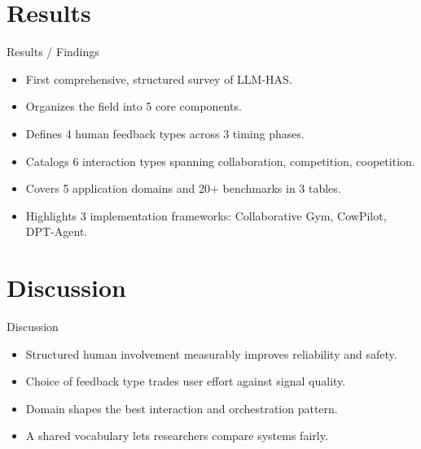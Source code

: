 \documentclass[10pt]{beamer}
\begin{document}
\section{Results}
\begin{frame}[allowframebreaks]{Results / Findings}
\begin{itemize}
  \item First comprehensive, structured survey of LLM-HAS.
  \item Organizes the field into 5 core components.
  \item Defines 4 human feedback types across 3 timing phases.
  \item Catalogs 6 interaction types spanning collaboration, competition, coopetition.
  \item Covers 5 application domains and 20+ benchmarks in 3 tables.
  \item Highlights 3 implementation frameworks: Collaborative Gym, CowPilot, DPT-Agent.
\end{itemize}
\end{frame}
\section{Discussion}
\begin{frame}{Discussion}
\begin{itemize}
  \item Structured human involvement measurably improves reliability and safety.
  \item Choice of feedback type trades user effort against signal quality.
  \item Domain shapes the best interaction and orchestration pattern.
  \item A shared vocabulary lets researchers compare systems fairly.
\end{itemize}
\end{frame}
\end{document}
